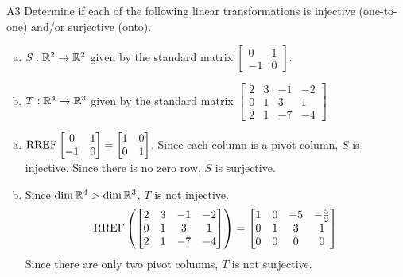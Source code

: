 \begin{problem}{A3}
Determine if each of the following linear transformations is injective (one-to-one) and/or surjective (onto).
\begin{enumerate}[(a)]
\item $S: \mathbb{R}^2 \rightarrow \mathbb{R}^2$ given by the standard matrix $\begin{bmatrix} 0 & 1 \\ -1 & 0 \end{bmatrix}$.
\item $T: \mathbb{R}^4 \rightarrow \mathbb{R}^3$ given by the standard matrix $\begin{bmatrix} 2 & 3 & -1 & -2 \\ 0 & 1 & 3 & 1 \\ 2 & 1 & -7 & -4 \end{bmatrix}$
\end{enumerate}
\end{problem}
\begin{solution}
\begin{enumerate}[(a)]
\item $ \operatorname{RREF}\begin{bmatrix} 0 & 1 \\ -1 & 0 \end{bmatrix}=\begin{bmatrix}1 & 0 \\ 0 & 1 \end{bmatrix}$.  Since each column is a pivot column, $S$ is injective.  Since there is no zero row, $S$ is surjective.
\item Since $\dim \mathbb{R}^4 > \dim \mathbb{R}^3$, $T$ is not injective.
$$\operatorname{RREF}\left(\begin{bmatrix} 2 & 3 & -1 & -2 \\ 0 & 1 & 3 & 1 \\ 2 & 1 & -7 & -4 \end{bmatrix}\right) = \begin{bmatrix} 1 & 0 & -5 & -\frac{5}{2} \\ 0 & 1 & 3 & 1 \\ 0 & 0 & 0 & 0\end{bmatrix}$$
Since there are only two pivot columns, $T$ is not surjective.
\end{enumerate}
\end{solution}


